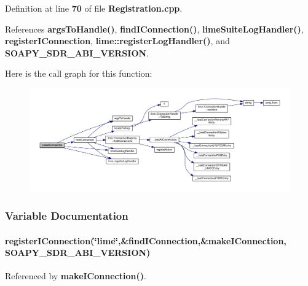 Definition at line {\bf 70} of file {\bf Registration.\+cpp}.



References {\bf args\+To\+Handle()}, {\bf find\+I\+Connection()}, {\bf lime\+Suite\+Log\+Handler()}, {\bf register\+I\+Connection}, {\bf lime\+::register\+Log\+Handler()}, and {\bf S\+O\+A\+P\+Y\+\_\+\+S\+D\+R\+\_\+\+A\+B\+I\+\_\+\+V\+E\+R\+S\+I\+ON}.



Here is the call graph for this function\+:
\nopagebreak
\begin{figure}[H]
\begin{center}
\leavevmode
\includegraphics[width=350pt]{da/dc9/Registration_8cpp_acd1bbddd8bc17adedce4f57d47ab8b54_cgraph}
\end{center}
\end{figure}




\subsubsection{Variable Documentation}
\paragraph[{register\+I\+Connection}]{ register\+I\+Connection(\char`\"{}lime\char`\"{},\&find\+I\+Connection,\&{\bf make\+I\+Connection}, {\bf S\+O\+A\+P\+Y\+\_\+\+S\+D\+R\+\_\+\+A\+B\+I\+\_\+\+V\+E\+R\+S\+I\+ON})\hspace{0.3cm}{\ttfamily [static]}}\label{Registration_8cpp_ad2c32597f97f8256cf01aad908b279df}


Referenced by {\bf make\+I\+Connection()}.

